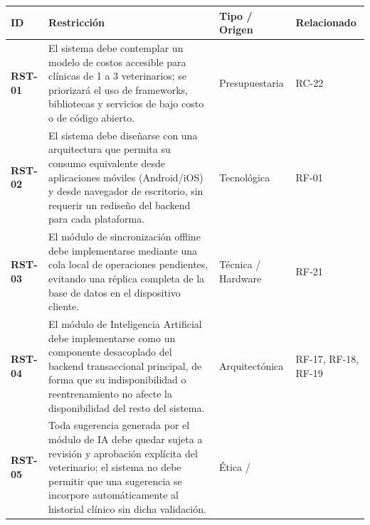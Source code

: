\documentclass[
]{article}
\newcounter{none} %
\begin{document}
{\def\LTcaptype{none} %
\begin{longtable}[]{@{}
  >{\raggedright\arraybackslash}p{}
  >{\raggedright\arraybackslash}p{}
  >{\raggedright\arraybackslash}p{}
  >{\raggedright\arraybackslash}p{}@{}}
\toprule\noalign{}
\begin{minipage}[b]{\linewidth}\raggedright
\textbf{ID}
\end{minipage} & \begin{minipage}[b]{\linewidth}\raggedright
\textbf{Restricción}
\end{minipage} & \begin{minipage}[b]{\linewidth}\raggedright
\textbf{Tipo / Origen}
\end{minipage} & \begin{minipage}[b]{\linewidth}\raggedright
\textbf{Relacionado}
\end{minipage} \\
\midrule\noalign{}
\endhead
\bottomrule\noalign{}
\endlastfoot
\textbf{RST-01} & El sistema debe contemplar un modelo de costos
accesible para clínicas de 1 a 3 veterinarios; se priorizará el uso de
frameworks, bibliotecas y servicios de bajo costo o de código abierto. & Presupuestaria & RC-22 \\
\textbf{RST-02} & El sistema debe diseñarse con una arquitectura que
permita su consumo equivalente desde aplicaciones móviles (Android/iOS)
y desde navegador de escritorio, sin requerir un rediseño del backend para cada plataforma. & Tecnológica & RF-01 \\
\textbf{RST-03} & El módulo de sincronización offline debe implementarse
mediante una cola local de operaciones pendientes, evitando una réplica
completa de la base de datos en el dispositivo cliente. & Técnica / Hardware & RF-21 \\
\textbf{RST-04} & El módulo de Inteligencia Artificial debe
implementarse como un componente desacoplado del backend transaccional principal, de forma que su indisponibilidad o reentrenamiento no afecte
la disponibilidad del resto del sistema. & Arquitectónica & RF-17,
RF-18, RF-19 \\
\textbf{RST-05} & Toda sugerencia generada por el módulo de IA debe
quedar sujeta a revisión y aprobación explícita del veterinario; el
sistema no debe permitir que una sugerencia se incorpore automáticamente al historial clínico sin dicha validación. & Ética /


\end{longtable}}
\end{document}
